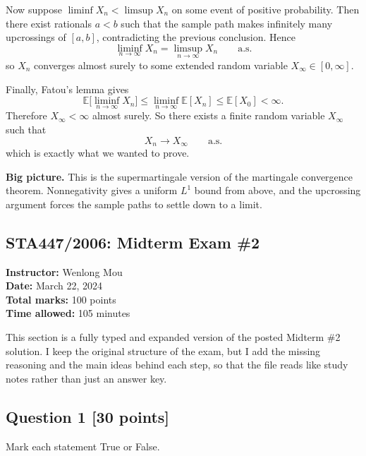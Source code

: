 \documentclass[11pt]{article}
\theoremstyle{definition}
\begin{document}
Now suppose \(\liminf X_n < \limsup X_n\) on some event of positive probability. Then there exist rationals \(a<b\) such that the sample path makes infinitely many upcrossings of \([a,b]\), contradicting the previous conclusion. Hence
\[
\liminf_{n\to\infty} X_n = \limsup_{n\to\infty} X_n
\qquad \text{a.s.}
\]
so \(X_n\) converges almost surely to some extended random variable \(X_\infty\in [0,\infty]\).

Finally, Fatou's lemma gives
\[
\mathbb E\bigl[\liminf_{n\to\infty} X_n\bigr]
\le
\liminf_{n\to\infty}\mathbb E[X_n]
\le
\mathbb E[X_0]<\infty.
\]
Therefore \(X_\infty<\infty\) almost surely. So there exists a finite random variable \(X_\infty\) such that
\[
X_n\to X_\infty
\qquad \text{a.s.}
\]
which is exactly what we wanted to prove.

\begin{summarybox}
\textbf{Big picture.} This is the supermartingale version of the martingale convergence theorem. Nonnegativity gives a uniform \(L^1\) bound from above, and the upcrossing argument forces the sample paths to settle down to a limit.
\end{summarybox}

\clearpage

\subsection*{STA447/2006: Midterm Exam \#2}
\textbf{Instructor:} Wenlong Mou\\
\textbf{Date:} March 22, 2024\\
\textbf{Total marks:} 100 points\\
\textbf{Time allowed:} 105 minutes

\begin{summarybox}
This section is a fully typed and expanded version of the posted Midterm \#2 solution. 
I keep the original structure of the exam, but I add the missing reasoning and the 
main ideas behind each step, so that the file reads like study notes rather than just an answer key.
\end{summarybox}

\subsection*{Question 1 \hfill [30 points]}
Mark each statement True or False.
\end{document}
